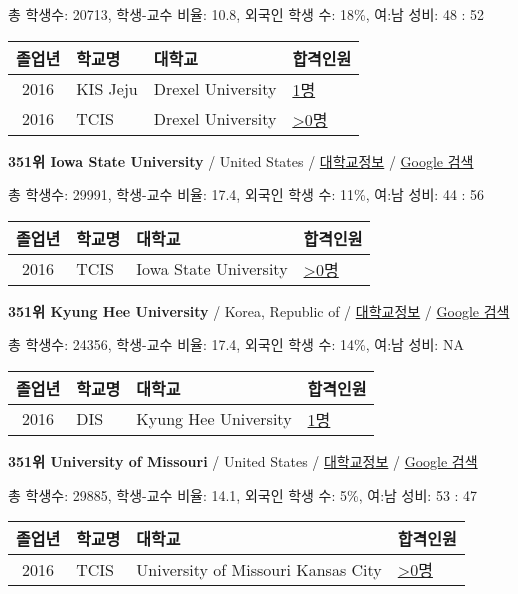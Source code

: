 \documentclass[13pt,]{article}
\begin{document}
총 학생수: 20713, 학생-교수 비율: 10.8, 외국인 학생 수: 18\%, 여:남
성비: 48 : 52

\begin{longtable}[]{@{}clll@{}}
\toprule
졸업년 & 학교명 & 대학교 & 합격인원\tabularnewline
\midrule
\endhead
2016 & KIS Jeju & Drexel University &
\href{http://cafe.naver.com/assarabia/11596}{1명}\tabularnewline
2016 & TCIS & Drexel University &
\href{http://cafe.naver.com/assarabia/11598}{\textgreater{}0명}\tabularnewline
\bottomrule
\end{longtable}

\textbf{351위 Iowa State University} / United States /
\href{https://www.timeshighereducation.com/world-university-rankings/iowa-state-university?ranking-dataset=589595}{대학교정보}
/ \href{http://www.google.com/search?q=Iowa+State+University}{Google
검색}

총 학생수: 29991, 학생-교수 비율: 17.4, 외국인 학생 수: 11\%, 여:남
성비: 44 : 56

\begin{longtable}[]{@{}clll@{}}
\toprule
졸업년 & 학교명 & 대학교 & 합격인원\tabularnewline
\midrule
\endhead
2016 & TCIS & Iowa State University &
\href{http://cafe.naver.com/assarabia/11598}{\textgreater{}0명}\tabularnewline
\bottomrule
\end{longtable}

\textbf{351위 Kyung Hee University} / Korea, Republic of /
\href{https://www.timeshighereducation.com/world-university-rankings/kyung-hee-university?ranking-dataset=589595}{대학교정보}
/ \href{http://www.google.com/search?q=Kyung+Hee+University}{Google
검색}

총 학생수: 24356, 학생-교수 비율: 17.4, 외국인 학생 수: 14\%, 여:남
성비: NA

\begin{longtable}[]{@{}clll@{}}
\toprule
졸업년 & 학교명 & 대학교 & 합격인원\tabularnewline
\midrule
\endhead
2016 & DIS & Kyung Hee University &
\href{http://cafe.naver.com/assarabia/11591}{1명}\tabularnewline
\bottomrule
\end{longtable}

\textbf{351위 University of Missouri} / United States /
\href{https://www.timeshighereducation.com/world-university-rankings/university-of-missouri?ranking-dataset=589595}{대학교정보}
/ \href{http://www.google.com/search?q=University+of+Missouri}{Google
검색}

총 학생수: 29885, 학생-교수 비율: 14.1, 외국인 학생 수: 5\%, 여:남 성비:
53 : 47

\begin{longtable}[]{@{}clll@{}}
\toprule
졸업년 & 학교명 & 대학교 & 합격인원\tabularnewline
\midrule
\endhead
2016 & TCIS & University of Missouri Kansas City &
\href{http://cafe.naver.com/assarabia/11598}{\textgreater{}0명}\tabularnewline
\bottomrule
\end{longtable}
\end{document}
